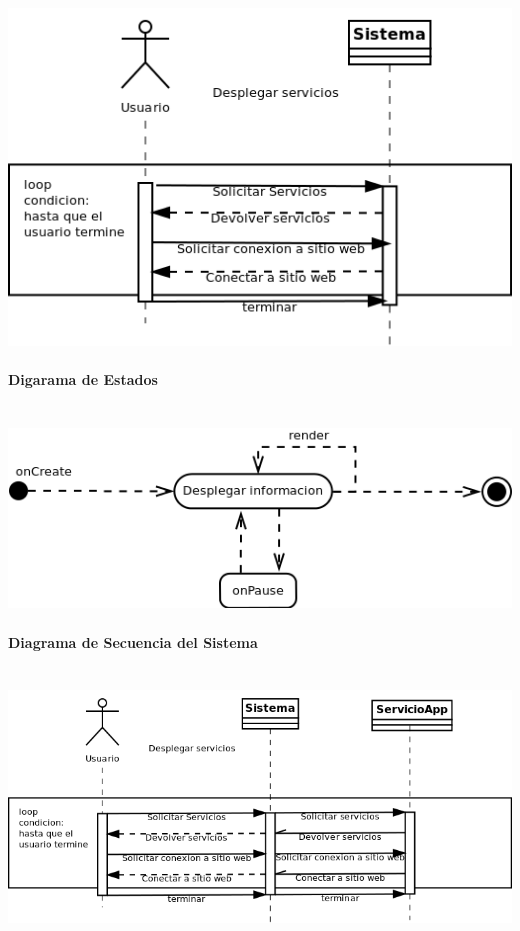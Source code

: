 \documentclass[12pt]{article}
\begin{document}
\includegraphics[width=\linewidth]{"../Documentos/Diagramas/CU2_Actividades"}

\paragraph{Digarama de Estados}\ \\

\includegraphics[width=\linewidth]{"../Documentos/Diagramas/CU2_Estados"}

\newpage
\paragraph{Diagrama de Secuencia del Sistema}\ \\

\includegraphics[width=\linewidth]{"../Documentos/Diagramas/CU2_SecuenciaSistema"}
\end{document}
